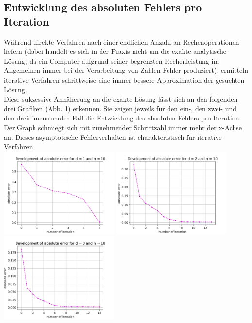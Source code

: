 \documentclass{scrartcl}
\begin{document}
\subsection{Entwicklung des absoluten Fehlers pro Iteration}
Während direkte Verfahren nach einer endlichen Anzahl an Rechenoperationen \grqq{} liefern (dabei handelt es sich in der Praxis nicht um die exakte analytische Lösung, da ein Computer aufgrund seiner begrenzten Rechenleistung im Allgemeinen immer bei der Verarbeitung von Zahlen Fehler produziert), ermitteln iterative Verfahren schrittweise eine immer bessere Approximation der gesuchten Lösung. \\ 
Diese sukzessive Annäherung an die exakte Lösung lässt sich an den folgenden drei Grafiken (Abb. 1) erkennen. 
Sie zeigen jeweils für den ein-, den zwei- und den dreidimensionalen Fall die Entwicklung des absoluten Fehlers pro Iteration. 
Der Graph schmiegt sich mit zunehmender Schrittzahl immer mehr der x-Achse an. 
Dieses asymptotische Fehlerverhalten ist charakteristisch für iterative Verfahren. \\

{
  \centering
    \includegraphics[width=0.45\textwidth]{Grafiken/iterates_d1_n10}
    \includegraphics[width=0.45\textwidth]{Grafiken/iterates_d2_n10}
    \includegraphics[width=0.45\textwidth]{Grafiken/iterates_d3_n10}
    \vspace{-0.2cm}
}
\vspace{0.5cm}
\end{document}
